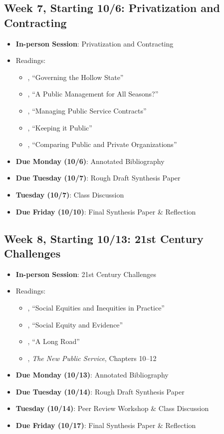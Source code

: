 \documentclass[12pt]{article}     %
\begin{document}
\subsection*{Week 7, Starting 10/6: Privatization and Contracting}
\begin{itemize}
    \item \textbf{In-person Session}: Privatization and Contracting
    \item Readings:
        \begin{itemize}
            \item \citet{MILWARD2000a}, ``Governing the Hollow State''
            \item \cite{hood1991}, ``A Public Management for All Seasons?''
            \item \citet{brownManagingPublicService2006}, ``Managing Public Service Contracts''
            \item \citet{jos2009}, ``Keeping it Public''
            \item \citet{RAINEY2000a}, ``Comparing Public and Private Organizations''
        \end{itemize}
    \item \textbf{Due Monday (10/6)}: Annotated Bibliography
    \item \textbf{Due Tuesday (10/7)}: Rough Draft Synthesis Paper
    \item \textbf{Tuesday (10/7)}: Class Discussion
    \item \textbf{Due Friday (10/10)}: Final Synthesis Paper \& Reflection
\end{itemize}

\subsection*{Week 8, Starting 10/13: 21st Century Challenges}
\begin{itemize}
    \item \textbf{In-person Session}: 21st Century Challenges
    \item Readings:
        \begin{itemize}
            \item \citet{maynard-moody2012}, ``Social Equities and Inequities in Practice'' 
            \item \citet{GOODEN2017}, ``Social Equity and Evidence'' 
            \item \citet{mccandless2022}, ``A Long Road''
            \item \citet{Denhardt2015}, \emph{The New Public Service}, Chapters 10--12 
        \end{itemize}
    \item \textbf{Due Monday (10/13)}: Annotated Bibliography
    \item \textbf{Due Tuesday (10/14)}: Rough Draft Synthesis Paper
    \item \textbf{Tuesday (10/14)}: Peer Review Workshop \& Class Discussion
    \item \textbf{Due Friday (10/17)}: Final Synthesis Paper \& Reflection
\end{itemize}
\end{document}
